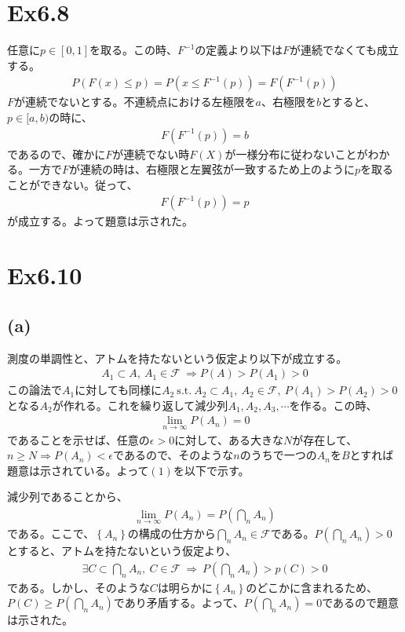 \documentclass{article}
\begin{document}
\section{Ex6.8}
任意に$p \in [0,1]$を取る。この時、$F^{-1}$の定義より以下は$F$が連続でなくても成立する。
\begin{align*}
	P\left( F(x) \leq p \right) = P\left( x \leq F^{-1}(p) \right) = F \left(F^{-1} (p)\right)
\end{align*}
$F$が連続でないとする。不連続点における左極限を$a$、右極限を$b$とすると、$p\in [a, b)$の時に、
\begin{align*}
	F \left(F^{-1} (p)\right) = b
\end{align*}
であるので、確かに$F$が連続でない時$F(X)$が一様分布に従わないことがわかる。一方で$F$が連続の時は、右極限と左翼弦が一致するため上のように$p$を取ることができない。従って、
\begin{align*}
	F \left(F^{-1} (p)\right) = p
\end{align*}
が成立する。よって題意は示された。

\section{Ex6.10}
\subsection{(a)}
測度の単調性と、アトムを持たないという仮定より以下が成立する。
\begin{align*}
	A_1 \subset A,\ A_1 \in \mathcal{F}\ \Rightarrow P(A) > P(A_1) > 0
\end{align*}
この論法で$A_1$に対しても同様に$A_2\ \text{s.t.}\ A_2 \subset A_1,\ A_2 \in \mathcal{F},\ P(A_1) > P(A_2) > 0$となる$A_2$が作れる。これを繰り返して減少列$A_1, A_2, A_3, \cdots$を作る。この時、
\begin{align}
	\lim_{n \to \infty} P\left(A_n \right) = 0
\end{align}
であることを示せば、任意の$\epsilon > 0$に対して、ある大きな$N$が存在して、$n \geq N \Rightarrow P(A_n) < \epsilon$であるので、そのような$n$のうちで一つの$A_n$を$B$とすれば題意は示されている。よって$(1)$を以下で示す。

減少列であることから、
\begin{align*}
	\lim_{n \to \infty} P(A_n) = P\left(\bigcap_n A_n \right)
\end{align*}
である。ここで、$\left\{ A_n \right\}$の構成の仕方から$\bigcap_n A_n \in \mathcal{F}$である。$P\left( \bigcap_n A_n \right) > 0$とすると、アトムを持たないという仮定より、
\begin{align*}
	\exists C \subset \bigcap_n A_n,\ C \in \mathcal{F} \ \Rightarrow\ P\left( \bigcap_n A_n \right) > p(C) > 0
\end{align*}
である。しかし、そのような$C$は明らかに$\left\{ A_n \right\}$のどこかに含まれるため、$P(C)\geq P\left( \bigcap_n A_n \right)$であり矛盾する。よって、$P\left( \bigcap_n A_n \right) = 0$であるので題意は示された。
\end{document}
